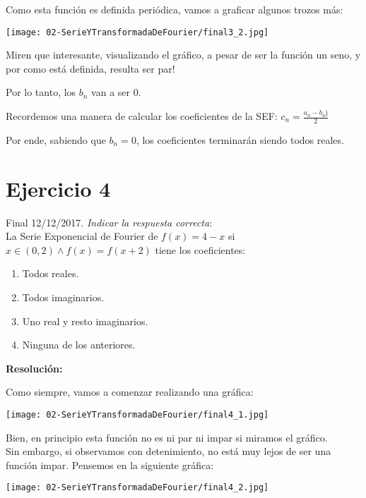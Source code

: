 \documentclass[11pt]{article}
\def\imj{\mathrm{j}}
\begin{document}
	Como esta función es definida periódica, vamos a graficar algunos trozos más:
	\begin{center}
		\texttt{[image: 02-SerieYTransformadaDeFourier/final3\_2.jpg]}
	\end{center}

	Miren que interesante, visualizando el gráfico, a pesar de ser la función un seno, y por como está definida, resulta ser par!
	
	Por lo tanto, los $b_{n}$ van a ser $0$.
	
	Recordemos una manera de calcular los coeficientes de la SEF: $c_{n}=\frac{a_{n}-b_{n}\imj}{2}$
	
	Por ende, sabiendo que $b_{n}=0$, los coeficientes terminarán siendo todos reales.
	
	\section{Ejercicio 4}
	Final 12/12/2017. \textit{Indicar la respuesta correcta}:\\
	La Serie Exponencial de Fourier de $f(x)=4-x$ si $x\in(0,2) \wedge f(x)=f(x+2)$ tiene los coeficientes:
	\renewcommand{\labelenumi}{\alph{enumi})}
	\begin{enumerate}
		\item Todos reales.
		\item Todos imaginarios.
		\item Uno real y resto imaginarios.
		\item Ninguna de los anteriores.
	\end{enumerate}

	\textbf{Resolución:}
	
	Como siempre, vamos a comenzar realizando una gráfica:
	\begin{center}
		\texttt{[image: 02-SerieYTransformadaDeFourier/final4\_1.jpg]}
	\end{center}

	Bien, en principio esta función no es ni par ni impar si miramos el gráfico. \\
	Sin embargo, si observamos con detenimiento, no está muy lejos de ser una función impar. Pensemos en la siguiente gráfica:
	
	\begin{center}
		\texttt{[image: 02-SerieYTransformadaDeFourier/final4\_2.jpg]}
	\end{center}
\end{document}
